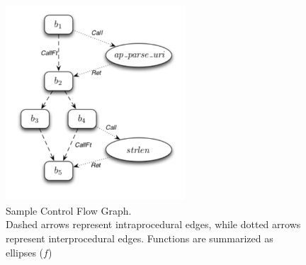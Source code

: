 \documentclass[a4paper, 12pt, journal, onecolumn]{IEEEtran}
\begin{document}
\begin{figure}[ht]
    \centering
    \captionsetup{justification=centering}
    \includegraphics[width=0.6\textwidth]{CFG2.png}
    \caption{Sample Control Flow Graph.\\ Dashed arrows represent intraprocedural edges, while dotted arrows represent interprocedural edges. Functions are summarized as ellipses ($f$) \cite{CFG} }
    \label{fig:CFG}
\end{figure}




\end{document}

